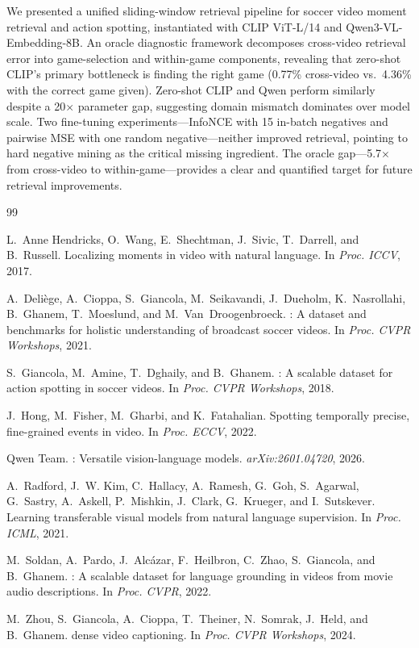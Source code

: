\documentclass[10pt,twocolumn]{article}
\begin{document}
We presented a unified sliding-window retrieval pipeline for soccer video moment retrieval and action spotting, instantiated with CLIP ViT-L/14 and Qwen3-VL-Embedding-8B. An oracle diagnostic framework decomposes cross-video retrieval error into game-selection and within-game components, revealing that zero-shot CLIP's primary bottleneck is finding the right game (0.77\% cross-video vs.\ 4.36\% with the correct game given). Zero-shot CLIP and Qwen perform similarly despite a 20$\times$ parameter gap, suggesting domain mismatch dominates over model scale. Two fine-tuning experiments---InfoNCE with 15 in-batch negatives and pairwise MSE with one random negative---neither improved retrieval, pointing to hard negative mining as the critical missing ingredient. The oracle gap---5.7$\times$ from cross-video to within-game---provides a clear and quantified target for future retrieval improvements.

\begin{thebibliography}{99}

L.~Anne Hendricks, O.~Wang, E.~Shechtman, J.~Sivic, T.~Darrell, and B.~Russell.
\newblock Localizing moments in video with natural language.
\newblock In \emph{Proc. ICCV}, 2017.

A.~Deli\`{e}ge, A.~Cioppa, S.~Giancola, M.~Seikavandi, J.~Dueholm, K.~Nasrollahi,
  B.~Ghanem, T.~Moeslund, and M.~Van~Droogenbroeck.
: A dataset and benchmarks for holistic understanding of
  broadcast soccer videos.
\newblock In \emph{Proc. CVPR Workshops}, 2021.

S.~Giancola, M.~Amine, T.~Dghaily, and B.~Ghanem.
: A scalable dataset for action spotting in soccer videos.
\newblock In \emph{Proc. CVPR Workshops}, 2018.

J.~Hong, M.~Fisher, M.~Gharbi, and K.~Fatahalian.
\newblock Spotting temporally precise, fine-grained events in video.
\newblock In \emph{Proc. ECCV}, 2022.

Qwen Team.
: Versatile vision-language models.
\newblock \emph{arXiv:2601.04720}, 2026.

A.~Radford, J.~W. Kim, C.~Hallacy, A.~Ramesh, G.~Goh, S.~Agarwal, G.~Sastry,
  A.~Askell, P.~Mishkin, J.~Clark, G.~Krueger, and I.~Sutskever.
\newblock Learning transferable visual models from natural language supervision.
\newblock In \emph{Proc. ICML}, 2021.

M.~Soldan, A.~Pardo, J.~Alc\'{a}zar, F.~Heilbron, C.~Zhao, S.~Giancola, and
  B.~Ghanem.
: A scalable dataset for language grounding in videos from movie
  audio descriptions.
\newblock In \emph{Proc. CVPR}, 2022.

M.~Zhou, S.~Giancola, A.~Cioppa, T.~Theiner, N.~Somrak, J.~Held, and
  B.~Ghanem.
 dense video captioning.
\newblock In \emph{Proc. CVPR Workshops}, 2024.

\end{thebibliography}
\end{document}
